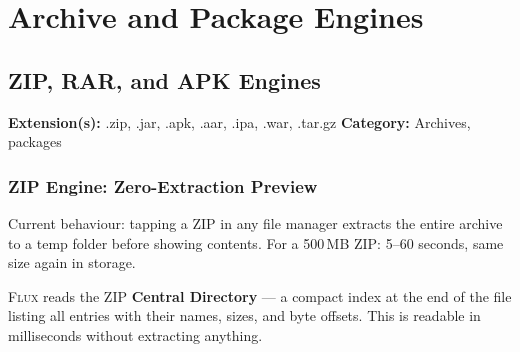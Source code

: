 \documentclass[11pt, a4paper, openright]{report}
\newcommand{\flux}{\textsc{Flux}}
\newcommand{\filesection}[3]{%
  \begin{insightbox}[title={File Type Overview: #1}]
  \textbf{Extension(s):} #2 \quad \textbf{Category:} #3
  \end{insightbox}
}
\begin{document}
\part{Archive and Package Engines}

\chapter{ZIP, RAR, and APK Engines}

\filesection{ZIP}{.zip, .jar, .apk, .aar, .ipa, .war, .tar.gz}{Archives, packages}

\section{ZIP Engine: Zero-Extraction Preview}

Current behaviour: tapping a ZIP in any file manager extracts the entire archive to a temp folder before showing contents. For a 500\,MB ZIP: 5--60 seconds, same size again in storage.

\flux{} reads the ZIP \textbf{Central Directory} --- a compact index at the end of the file listing all entries with their names, sizes, and byte offsets. This is readable in milliseconds without extracting anything.
\end{document}

